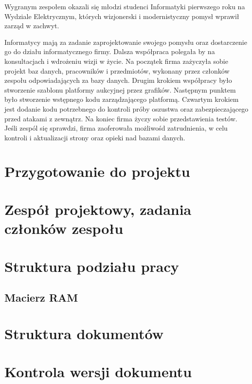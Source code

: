 \documentclass[10pt,a4paper]{article}
\begin{document}
Wygranym zespołem okazali się młodzi studenci Informatyki pierwszego roku na
Wydziale Elektrycznym, których wizjonerski i modernistyczny pomysł wprawił
zarząd w zachwyt.

Informatycy mają za zadanie zaprojektowanie swojego pomysłu oraz dostarczenie
go do działu informatycznego firmy. Dalsza współpraca polegała by na
konsultacjach i wdrożeniu wizji w życie. Na początek firma zażyczyła sobie
projekt baz danych, pracowników i przedmiotów, wykonany przez członków zespołu
odpowiadających za bazy danych. Drugim krokiem współpracy było stworzenie
szablonu platformy aukcyjnej przez grafików. Następnym punktem było stworzenie
wstępnego kodu zarządzającego platformą. Czwartym krokiem jest dodanie kodu
potrzebnego do kontroli próby oszustwa oraz zabezpieczającego przed atakami z
zewnątrz. Na koniec firma życzy sobie przedstawienia testów. Jeśli zespól się
sprawdzi, firma zaoferowała możliwośd zatrudnienia, w celu kontroli i
aktualizacji strony oraz opieki nad bazami danych.

\section{Przygotowanie do projektu}

\section{Zespół projektowy, zadania członków zespołu}

\section{Struktura podziału pracy}
\subsection{Macierz RAM}

\section{Struktura dokumentów}

\section{Kontrola wersji dokumentu}
\end{document}
